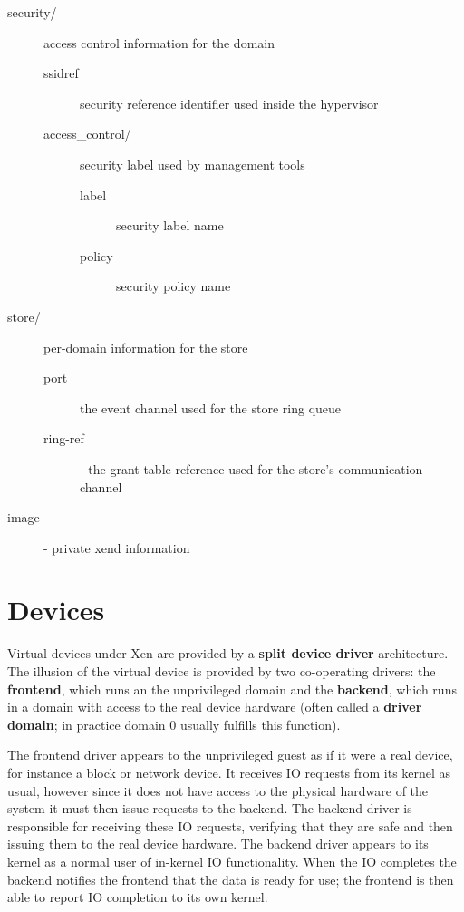 \documentclass[11pt,twoside,final,openright,a4paper]{report}
\begin{document}
\begin{description}
  \item[security/] access control information for the domain
    \begin{description}
    \item[ssidref] security reference identifier used inside the hypervisor
    \item[access\_control/] security label used by management tools
      \begin{description}
       \item[label] security label name
       \item[policy] security policy name
      \end{description}
    \end{description}

  \item[store/] per-domain information for the store
    \begin{description}
    \item[port] the event channel used for the store ring queue 
    \item[ring-ref] - the grant table reference used for the store's
      communication channel 
    \end{description}
    
  \item[image] - private xend information 
\end{description}


\chapter{Devices}
\label{c:devices}

Virtual devices under Xen are provided by a {\bf split device driver}
architecture.  The illusion of the virtual device is provided by two
co-operating drivers: the {\bf frontend}, which runs an the
unprivileged domain and the {\bf backend}, which runs in a domain with
access to the real device hardware (often called a {\bf driver
domain}; in practice domain 0 usually fulfills this function).

The frontend driver appears to the unprivileged guest as if it were a
real device, for instance a block or network device.  It receives IO
requests from its kernel as usual, however since it does not have
access to the physical hardware of the system it must then issue
requests to the backend.  The backend driver is responsible for
receiving these IO requests, verifying that they are safe and then
issuing them to the real device hardware.  The backend driver appears
to its kernel as a normal user of in-kernel IO functionality.  When
the IO completes the backend notifies the frontend that the data is
ready for use; the frontend is then able to report IO completion to
its own kernel.
\end{document}
